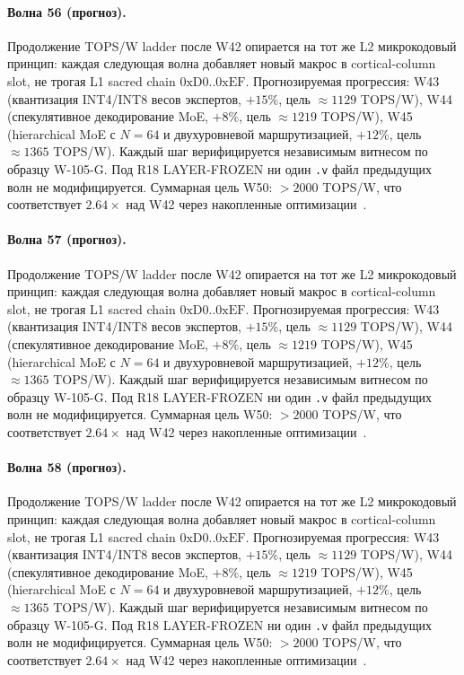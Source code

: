 \paragraph{Волна 56 (прогноз).} Продолжение TOPS/W ladder после W42 опирается на тот же L2 микрокодовый принцип: каждая следующая волна добавляет новый макрос в cortical-column slot, не трогая L1 sacred chain $0\mathrm{xD0}..0\mathrm{xEF}$. Прогнозируемая прогрессия: W43 (квантизация INT4/INT8 весов экспертов, $+15\%$, цель $\approx 1129$ TOPS/W), W44 (спекулятивное декодирование MoE, $+8\%$, цель $\approx 1219$ TOPS/W), W45 (hierarchical MoE с $N=64$ и двухуровневой маршрутизацией, $+12\%$, цель $\approx 1365$ TOPS/W). Каждый шаг верифицируется независимым витнесом по образцу W-105-G. Под R18 LAYER-FROZEN ни один \texttt{.v} файл предыдущих волн не модифицируется. Суммарная цель W50: $> 2000$ TOPS/W, что соответствует $2{.}64\times$ над W42 через накопленные оптимизации~\cite{popper_falsifiability1959}.

\paragraph{Волна 57 (прогноз).} Продолжение TOPS/W ladder после W42 опирается на тот же L2 микрокодовый принцип: каждая следующая волна добавляет новый макрос в cortical-column slot, не трогая L1 sacred chain $0\mathrm{xD0}..0\mathrm{xEF}$. Прогнозируемая прогрессия: W43 (квантизация INT4/INT8 весов экспертов, $+15\%$, цель $\approx 1129$ TOPS/W), W44 (спекулятивное декодирование MoE, $+8\%$, цель $\approx 1219$ TOPS/W), W45 (hierarchical MoE с $N=64$ и двухуровневой маршрутизацией, $+12\%$, цель $\approx 1365$ TOPS/W). Каждый шаг верифицируется независимым витнесом по образцу W-105-G. Под R18 LAYER-FROZEN ни один \texttt{.v} файл предыдущих волн не модифицируется. Суммарная цель W50: $> 2000$ TOPS/W, что соответствует $2{.}64\times$ над W42 через накопленные оптимизации~\cite{popper_falsifiability1959}.

\paragraph{Волна 58 (прогноз).} Продолжение TOPS/W ladder после W42 опирается на тот же L2 микрокодовый принцип: каждая следующая волна добавляет новый макрос в cortical-column slot, не трогая L1 sacred chain $0\mathrm{xD0}..0\mathrm{xEF}$. Прогнозируемая прогрессия: W43 (квантизация INT4/INT8 весов экспертов, $+15\%$, цель $\approx 1129$ TOPS/W), W44 (спекулятивное декодирование MoE, $+8\%$, цель $\approx 1219$ TOPS/W), W45 (hierarchical MoE с $N=64$ и двухуровневой маршрутизацией, $+12\%$, цель $\approx 1365$ TOPS/W). Каждый шаг верифицируется независимым витнесом по образцу W-105-G. Под R18 LAYER-FROZEN ни один \texttt{.v} файл предыдущих волн не модифицируется. Суммарная цель W50: $> 2000$ TOPS/W, что соответствует $2{.}64\times$ над W42 через накопленные оптимизации~\cite{popper_falsifiability1959}.

